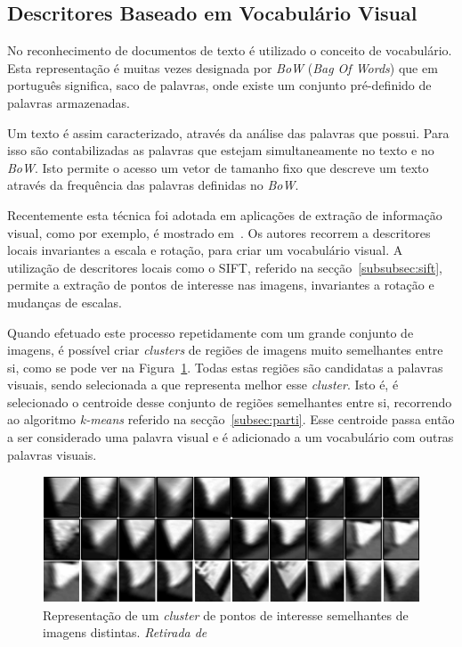
\subsection{Descritores Baseado em Vocabulário Visual}\label{subsec: vocab}

No reconhecimento de documentos de texto é utilizado o conceito de vocabulário. Esta representação é muitas vezes designada por \textit{BoW} (\textit{Bag Of Words}) que em português significa, saco de palavras, onde existe um conjunto pré-definido de palavras armazenadas. 

Um texto é assim caracterizado, através da análise das palavras que possui. Para isso são contabilizadas as palavras que estejam simultaneamente no texto e no \textit{BoW}. Isto permite o acesso um vetor de tamanho fixo que descreve um texto através da frequência das palavras definidas no \textit{BoW}. 

Recentemente esta técnica foi adotada em aplicações de extração de informação visual, como por exemplo, é mostrado em~\cite{Sivic2003, Sivic2006}. Os autores recorrem a descritores locais invariantes a escala e rotação, para criar um vocabulário visual. A utilização de descritores locais como o SIFT, referido na secção~\ref{subsubsec:sift}, permite a extração de pontos de interesse nas imagens, invariantes a rotação e mudanças de escalas.

Quando efetuado este processo repetidamente com um grande conjunto de imagens, é possível criar \textit{clusters} de regiões de imagens muito semelhantes entre si, como se pode ver na Figura~\ref{fig:visualword}. Todas estas regiões são candidatas a palavras visuais, sendo selecionada a que representa melhor esse \textit{cluster}. Isto é, é selecionado o centroide desse conjunto de regiões semelhantes entre si, recorrendo ao algoritmo \textit{k-means} referido na secção~\ref{subsec:parti}. Esse centroide passa então a ser considerado uma palavra visual e é adicionado a um vocabulário com outras palavras visuais.

\begin{figure}[h]
\centering
\includegraphics[width=0.4\linewidth]{./figures/visual_word_1}
\caption{Representação de um \textit{cluster} de pontos de interesse semelhantes de imagens distintas. \textit{Retirada de}~\cite{Sivic2003}}
\label{fig:visualword}
\end{figure}

